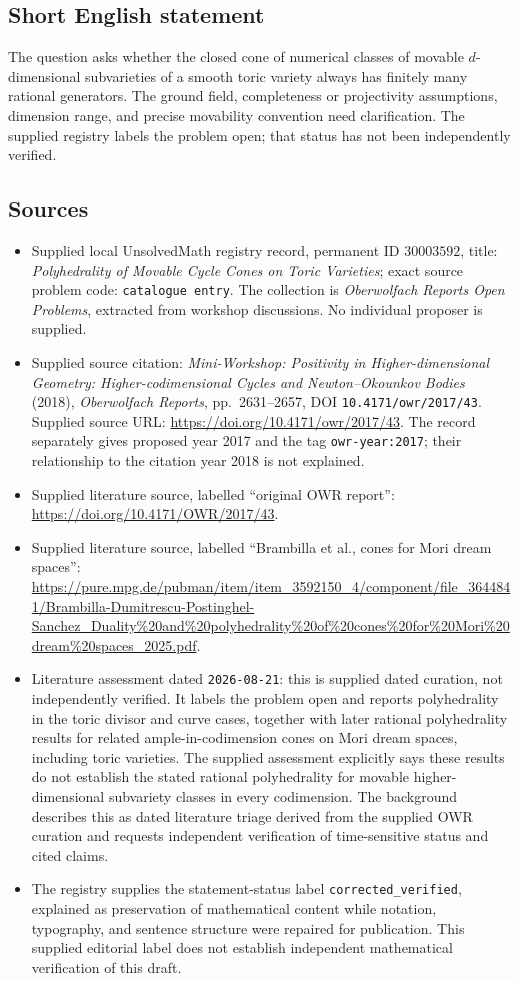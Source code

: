 \documentclass[11pt]{article}
\begin{document}
\subsection{Short English statement}
The question asks whether the closed cone of numerical classes of movable \(d\)-dimensional subvarieties of a smooth toric variety always has finitely many rational generators. The ground field, completeness or projectivity assumptions, dimension range, and precise movability convention need clarification. The supplied registry labels the problem open; that status has not been independently verified.
\subsection{Sources}
\begin{itemize}
\item Supplied local UnsolvedMath registry record, permanent ID \(30003592\), title: \emph{Polyhedrality of Movable Cycle Cones on Toric Varieties}; exact source problem code: \texttt{catalogue entry}. The collection is \emph{Oberwolfach Reports Open Problems}, extracted from workshop discussions. No individual proposer is supplied.
\item Supplied source citation: \emph{Mini-Workshop: Positivity in Higher-dimensional Geometry: Higher-codimensional Cycles and Newton--Okounkov Bodies} (2018), \emph{Oberwolfach Reports}, pp.\ 2631--2657, DOI \texttt{10.4171/owr/2017/43}. Supplied source URL: \url{https://doi.org/10.4171/owr/2017/43}. The record separately gives proposed year 2017 and the tag \texttt{owr-year:2017}; their relationship to the citation year 2018 is not explained.
\item Supplied literature source, labelled ``original OWR report'': \url{https://doi.org/10.4171/OWR/2017/43}.
\item Supplied literature source, labelled ``Brambilla et al., cones for Mori dream spaces'': \url{https://pure.mpg.de/pubman/item/item_3592150_4/component/file_3644841/Brambilla-Dumitrescu-Postinghel-Sanchez_Duality%20and%20polyhedrality%20of%20cones%20for%20Mori%20dream%20spaces_2025.pdf}.
\item Literature assessment dated \texttt{2026-08-21}: this is supplied dated curation, not independently verified. It labels the problem open and reports polyhedrality in the toric divisor and curve cases, together with later rational polyhedrality results for related ample-in-codimension cones on Mori dream spaces, including toric varieties. The supplied assessment explicitly says these results do not establish the stated rational polyhedrality for movable higher-dimensional subvariety classes in every codimension. The background describes this as dated literature triage derived from the supplied OWR curation and requests independent verification of time-sensitive status and cited claims.
\item The registry supplies the statement-status label \texttt{corrected\_verified}, explained as preservation of mathematical content while notation, typography, and sentence structure were repaired for publication. This supplied editorial label does not establish independent mathematical verification of this draft.
\end{itemize}
\end{document}
